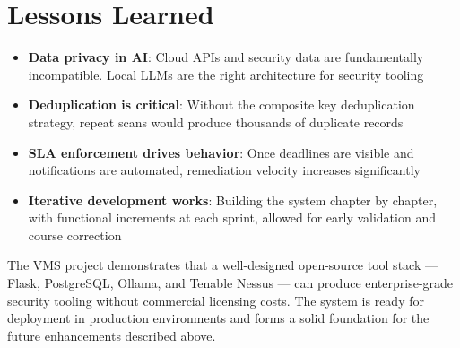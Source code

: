 \section*{Lessons Learned}

\begin{itemize}
  \item \textbf{Data privacy in AI}: Cloud APIs and security data are fundamentally incompatible. Local LLMs are the right architecture for security tooling
  \item \textbf{Deduplication is critical}: Without the composite key deduplication strategy, repeat scans would produce thousands of duplicate records
  \item \textbf{SLA enforcement drives behavior}: Once deadlines are visible and notifications are automated, remediation velocity increases significantly
  \item \textbf{Iterative development works}: Building the system chapter by chapter, with functional increments at each sprint, allowed for early validation and course correction
\end{itemize}

\vspace{1em}
\noindent The VMS project demonstrates that a well-designed open-source tool stack — Flask, PostgreSQL, Ollama, and Tenable Nessus — can produce enterprise-grade security tooling without commercial licensing costs. The system is ready for deployment in production environments and forms a solid foundation for the future enhancements described above.
